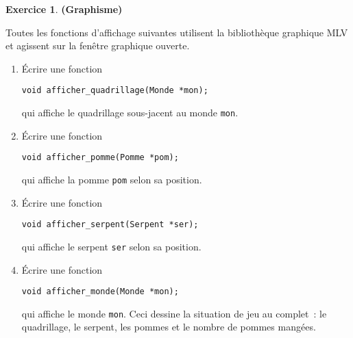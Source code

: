 \documentclass[12pt]{article}
\theoremstyle{definition}
\newtheorem{Exercice}{Exercice}
\begin{document}
\begin{Exercice} {\bf (Graphisme)}\smallskip

Toutes les fonctions d'affichage suivantes utilisent la bibliothèque
graphique {\sf MLV} et agissent sur la fenêtre graphique ouverte.

\begin{enumerate}
    \item Écrire une fonction
\begin{lstlisting}
void afficher_quadrillage(Monde *mon);
\end{lstlisting}
    qui affiche le quadrillage sous-jacent au monde {\tt mon}.
    \smallskip

    \item Écrire une fonction
\begin{lstlisting}
void afficher_pomme(Pomme *pom);
\end{lstlisting}
    qui affiche la pomme {\tt pom} selon sa position.
    \smallskip

    \item Écrire une fonction
\begin{lstlisting}
void afficher_serpent(Serpent *ser);
\end{lstlisting}
    qui affiche le serpent {\tt ser} selon sa position.
    \smallskip

    \item Écrire une fonction
\begin{lstlisting}
void afficher_monde(Monde *mon);
\end{lstlisting}
    qui affiche le monde {\tt mon}. Ceci dessine la situation de jeu
    au complet~: le quadrillage, le serpent, les pommes et le nombre
    de pommes mangées.
\end{enumerate}
\end{Exercice}
\bigskip
\end{document}
